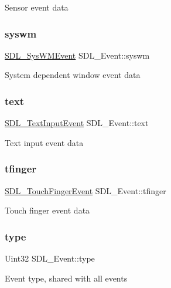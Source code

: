 Sensor event data \mbox{\label{union_s_d_l___event_ab3b2eaf5348d4c50a51b1f297fdef537}} 
\subsubsection{\texorpdfstring{syswm}{syswm}}
{\footnotesize\ttfamily \mbox{\hyperlink{struct_s_d_l___sys_w_m_event}{S\+D\+L\+\_\+\+Sys\+W\+M\+Event}} S\+D\+L\+\_\+\+Event\+::syswm}

System dependent window event data \mbox{\label{union_s_d_l___event_aa4fc65c559d69f33c057c0c23d8414b8}} 
\subsubsection{\texorpdfstring{text}{text}}
{\footnotesize\ttfamily \mbox{\hyperlink{struct_s_d_l___text_input_event}{S\+D\+L\+\_\+\+Text\+Input\+Event}} S\+D\+L\+\_\+\+Event\+::text}

Text input event data \mbox{\label{union_s_d_l___event_ab18d7d60794cb056948ffa58541bc3c5}} 
\subsubsection{\texorpdfstring{tfinger}{tfinger}}
{\footnotesize\ttfamily \mbox{\hyperlink{struct_s_d_l___touch_finger_event}{S\+D\+L\+\_\+\+Touch\+Finger\+Event}} S\+D\+L\+\_\+\+Event\+::tfinger}

Touch finger event data \mbox{\label{union_s_d_l___event_a237648bec242d2d5835f1a4250ddfa46}} 
\subsubsection{\texorpdfstring{type}{type}}
{\footnotesize\ttfamily Uint32 S\+D\+L\+\_\+\+Event\+::type}

Event type, shared with all events \mbox{\label{union_s_d_l___event_ab7c394e3ce7bf1e4f8d68bc0e9f1b042}} 
